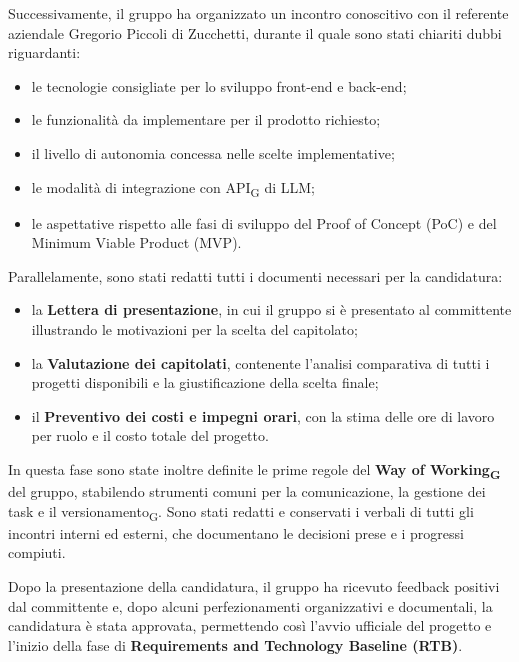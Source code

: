 \documentclass[11pt,a4paper]{article}
\newcommand{\gls}[1]{#1\textsubscript{G}}
\begin{document}
Successivamente, il gruppo ha organizzato un incontro conoscitivo con il referente aziendale Gregorio Piccoli di Zucchetti, durante il quale sono stati chiariti dubbi riguardanti:
\begin{itemize}
    \item le tecnologie consigliate per lo sviluppo front-end e back-end;
    \item le funzionalità da implementare per il prodotto richiesto;
    \item il livello di autonomia concessa nelle scelte implementative;
    \item le modalità di integrazione con \gls{API} di LLM;
    \item le aspettative rispetto alle fasi di sviluppo del Proof of Concept (PoC) e del Minimum Viable Product (MVP).
\end{itemize}

Parallelamente, sono stati redatti tutti i documenti necessari per la candidatura:
\begin{itemize}
    \item la \textbf{Lettera di presentazione}, in cui il gruppo si è presentato al committente illustrando le motivazioni per la scelta del capitolato;
    \item la \textbf{Valutazione dei capitolati}, contenente l'analisi comparativa di tutti i progetti disponibili e la giustificazione della scelta finale;
    \item il \textbf{Preventivo dei costi e impegni orari}, con la stima delle ore di lavoro per ruolo e il costo totale del progetto.
\end{itemize}

In questa fase sono state inoltre definite le prime regole del \textbf{\gls{Way of Working}} del gruppo, stabilendo strumenti comuni per la comunicazione, la gestione dei task e il \gls{versionamento}. Sono stati redatti e conservati i verbali di tutti gli incontri interni ed esterni, che documentano le decisioni prese e i progressi compiuti.

Dopo la presentazione della candidatura, il gruppo ha ricevuto feedback positivi dal committente e, dopo alcuni perfezionamenti organizzativi e documentali, la candidatura è stata approvata, permettendo così l'avvio ufficiale del progetto e l'inizio della fase di \textbf{Requirements and Technology Baseline (RTB)}.

\newpage

\end{document}
